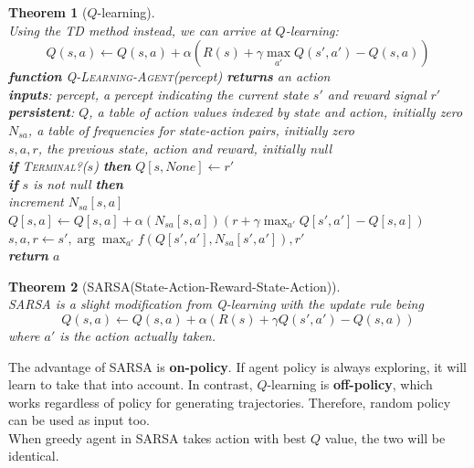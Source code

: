 \documentclass[12pt]{article}
\newcommand{\ind}{\hspace*{15pt}}
\newtheorem{theorem}{Theorem}[section]
\theoremstyle{definition}
\begin{document}
\begin{theorem}[{$Q$}-learning]
\hfill\\\normalfont Using the TD method instead, we can arrive at $Q$-learning:
\[
Q(s,a)\leftarrow Q(s,a)+\alpha(R(s)+\gamma \max_{a'}Q(s', a')-Q(s,a))
\]
\textbf{function} \textsc{Q-Learning-Agent}(\textit{percept}) \textbf{returns} an action\\
\ind \textbf{inputs}: \textit{percept}, a percept indicating the current state $s'$ and reward signal $r'$\\
\ind \textbf{persistent}: $Q$, a table of action values indexed by state and action, initially zero\\
\ind \ind \ind \ind $N_{sa}$, a table of frequencies for state-action pairs, initially zero\\
\ind \ind \ind \ind $s,a,r$, the previous state, action and reward, initially null\\

\ind \textbf{if} \textsc{Terminal?}($s$) \textbf{then} $Q[s,None]\leftarrow r'$\\
\ind \textbf{if} $s$ is not null \textbf{then}\\
\ind \ind increment $N_{sa}[s,a]$\\
\ind \ind $Q[s,a]\leftarrow Q[s,a]+\alpha(N_{sa}[s,a])(r+\gamma \max_{a'}Q[s',a']-Q[s,a])$\\
\ind $s,a,r\leftarrow s', \arg\max_{a'} f(Q[s', a'], N_{sa}[s', a']),r'$\\
\ind \textbf{return} $a$
\end{theorem}
\begin{theorem}[SARSA(State-Action-Reward-State-Action)]
\hfill\\\normalfont SARSA is a slight modification from Q-learning with the update rule being
\[
Q(s,a)\leftarrow Q(s,a)+\alpha(R(s)+\gamma Q(s',a')-Q(s,a))
\]
where $a'$ is the action actually taken.
\end{theorem}
The advantage of SARSA is \textbf{on-policy}. If agent policy is always exploring, it will learn to take that into account. In contrast, $Q$-learning is \textbf{off-policy}, which works regardless of policy for generating trajectories. Therefore, random policy can be used as input too.\\
When greedy agent in SARSA takes action with best $Q$ value, the two will be identical.
\end{document}
